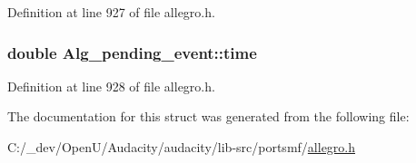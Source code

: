 Definition at line 927 of file allegro.\+h.

\subsubsection[{\texorpdfstring{time}{time}}]{\setlength{\rightskip}{0pt plus 5cm}double Alg\+\_\+pending\+\_\+event\+::time}\hypertarget{struct_alg__pending__event_a7508ce31a50f82f4b6bf08b6bdd07b3f}{}\label{struct_alg__pending__event_a7508ce31a50f82f4b6bf08b6bdd07b3f}


Definition at line 928 of file allegro.\+h.



The documentation for this struct was generated from the following file\+:\begin{DoxyCompactItemize}
\item 
C\+:/\+\_\+dev/\+Open\+U/\+Audacity/audacity/lib-\/src/portsmf/\hyperlink{allegro_8h}{allegro.\+h}\end{DoxyCompactItemize}
